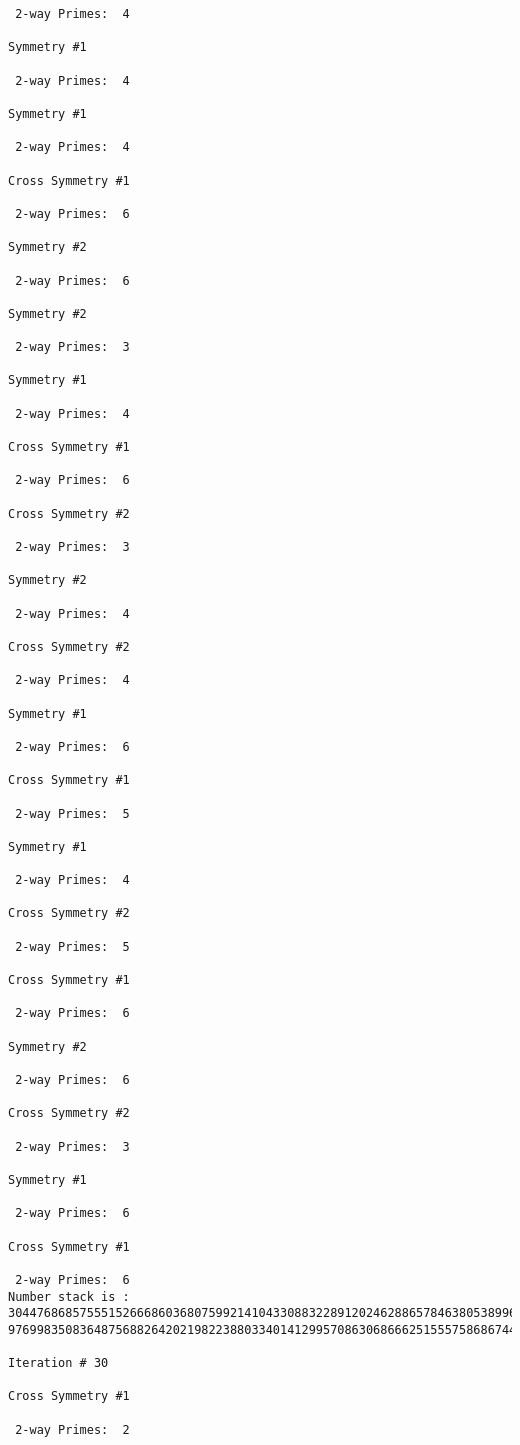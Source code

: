 {{{{\begin{verbatim}
 2-way Primes: 	4

Symmetry #1

 2-way Primes: 	4

Symmetry #1

 2-way Primes: 	4

Cross Symmetry #1

 2-way Primes: 	6

Symmetry #2

 2-way Primes: 	6

Symmetry #2

 2-way Primes: 	3

Symmetry #1

 2-way Primes: 	4

Cross Symmetry #1

 2-way Primes: 	6

Cross Symmetry #2

 2-way Primes: 	3

Symmetry #2

 2-way Primes: 	4

Cross Symmetry #2

 2-way Primes: 	4

Symmetry #1

 2-way Primes: 	6

Cross Symmetry #1

 2-way Primes: 	5

Symmetry #1

 2-way Primes: 	4

Cross Symmetry #2

 2-way Primes: 	5

Cross Symmetry #1

 2-way Primes: 	6

Symmetry #2

 2-way Primes: 	6

Cross Symmetry #2

 2-way Primes: 	3

Symmetry #1

 2-way Primes: 	6

Cross Symmetry #1

 2-way Primes: 	6
Number stack is :
30447686857555152666860368075992141043308832289120246288657846380538996794608835958544046240163340857
97699835083648756882642021982238803340141299570863068666251555758686744037580433610426404458595388064

Iteration #	30

Cross Symmetry #1

 2-way Primes: 	2


\end{verbatim}}}}}
